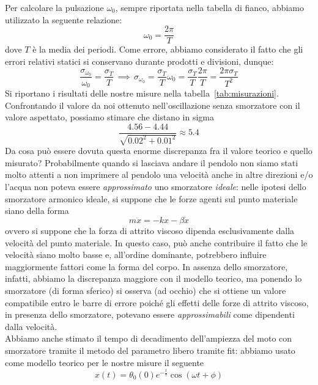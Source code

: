 \documentclass{article}
\begin{document}
\noindent Per calcolare la pulsazione $\omega_0$, sempre riportata nella tabella di fianco, abbiamo utilizzato la seguente relazione:
\begin{equation}
	\omega_0 = \frac{2\pi}{T}
\end{equation}
dove $T$ è la media dei periodi. Come errore, abbiamo considerato il fatto che gli errori relativi statici si conservano durante prodotti e divisioni, dunque:
\begin{equation*}
	\frac{\sigma_{\omega_0}}{\omega_0} = \frac{\sigma_{T}}{T} \, \implies \, \sigma_{\omega_0} = \frac{\sigma_T}{T} \omega_0 = \frac{\sigma_T}{T} \frac{2\pi}{T} = \frac{2\pi \sigma_T}{T^2}
\end{equation*}
Si riportano i risultati delle nostre misure nella tabella~\ref{tab:misurazioni}. \\ 
Confrontando il valore da noi ottenuto nell'oscillazione senza smorzatore con il valore aspettato, possiamo stimare che distano in sigma
\begin{equation*}
	\frac{4.56 - 4.44}{\sqrt{0.02^2 + 0.01^2}} \approx 5.4
\end{equation*}
Da cosa può essere dovuta questa enorme discrepanza fra il valore teorico e quello misurato? Probabilmente quando si lasciava andare il pendolo non siamo stati molto attenti a non imprimere al pendolo una velocità anche in altre direzioni e/o l'acqua non poteva essere \emph{approssimato} uno smorzatore \emph{ideale}: nelle ipotesi dello smorzatore armonico ideale, si suppone che le forze agenti sul punto materiale siano della forma
$$
m\ddot{x} = -kx - \beta \dot{x}
$$
ovvero si suppone che la forza di attrito viscoso dipenda esclusivamente dalla velocità del punto materiale. In questo caso, può anche contribuire il fatto che le velocità siano molto basse e, all'ordine dominante, potrebbero influire maggiormente fattori come la forma del corpo. In assenza dello smorzatore, infatti, abbiamo la discrepanza maggiore con il modello teorico, ma ponendo lo smorzatore (di forma sferico) si osserva (ad occhio) che si ottiene un valore compatibile entro le barre di errore poiché gli effetti delle forze di attrito viscoso, in presenza dello smorzatore, potevano essere \emph{approssimabili} come dipendenti dalla velocità. \\
Abbiamo anche stimato il tempo di decadimento dell'ampiezza del moto con smorzatore tramite il metodo del parametro libero tramite fit: abbiamo usato come modello teorico per le nostre misure il seguente
\begin{equation}
	x(t) = \theta_0 (0)e^{-\frac{t}{\tau}}\cos{\left( \omega t + \phi \right) }
	\label{eq:modello_teorico}
\end{equation}
\end{document}
